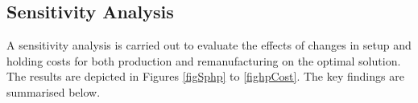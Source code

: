 \documentclass[11pt]{article}
\newtheorem{example}{Example}[section]
\begin{document}



\subsection{Sensitivity Analysis} \label{sec4b}
A sensitivity analysis is carried out to evaluate the effects of changes in setup and holding costs for both production and remanufacturing on the optimal solution. The results are depicted in Figures \ref{figSphp} to \ref{fighpCost}. The key findings are summarised below.
\end{document}
